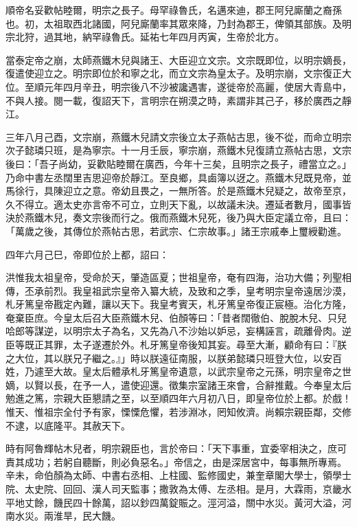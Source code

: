 
\begin{pinyinscope}

 順帝名妥歡帖睦爾，明宗之長子。母罕祿魯氏，名邁來迪，郡王阿兒廝蘭之裔孫也。初，太祖取西北諸國，阿兒廝蘭率其眾來降，乃封為郡王，俾領其部族。及明宗北狩，過其地，納罕祿魯氏。延祐七年四月丙寅，生帝於北方。



 當泰定帝之崩，太師燕鐵木兒與諸王、大臣迎立文宗。文宗既即位，以明宗嫡長，復遣使迎立之。明宗即位於和寧之北，而立文宗為皇太子。及明宗崩，文宗復正大位。至順元年四月辛丑，明宗後八不沙被讒遇害，遂徙帝於高麗，使居大青島中，不與人接。閱一載，復詔天下，言明宗在朔漠之時，素謂非其己子，移於廣西之靜江。



 三年八月己酉，文宗崩，燕鐵木兒請文宗後立太子燕帖古思，後不從，而命立明宗次子懿璘只班，是為寧宗。十一月壬辰，寧宗崩，燕鐵木兒復請立燕帖古思，文宗後曰：「吾子尚幼，妥歡貼睦爾在廣西，今年十三矣，且明宗之長子，禮當立之。」乃命中書左丞闊里吉思迎帝於靜江。至良鄉，具鹵簿以迓之。燕鐵木兒既見帝，並馬徐行，具陳迎立之意。帝幼且畏之，一無所答。於是燕鐵木兒疑之，故帝至京，久不得立。適太史亦言帝不可立，立則天下亂，以故議未決。遷延者數月，國事皆決於燕鐵木兒，奏文宗後而行之。俄而燕鐵木兒死，後乃與大臣定議立帝，且曰：「萬歲之後，其傳位於燕帖古思，若武宗、仁宗故事。」諸王宗戚奉上璽綬勸進。



 四年六月己巳，帝即位於上都，詔曰：



 洪惟我太祖皇帝，受命於天，肇造區夏；世祖皇帝，奄有四海，治功大備；列聖相傳，丕承前烈。我皇祖武宗皇帝入纂大統，及致和之季，皇考明宗皇帝遠居沙漠，札牙篤皇帝戡定內難，讓以天下。我皇考賓天，札牙篤皇帝復正宸極。治化方隆，奄棄臣庶。今皇太后召大臣燕鐵木兒、伯顏等曰：「昔者闊徹伯、脫脫木兒、只兒哈郎等謀逆，以明宗太子為名，又先為八不沙始以妒忌，妄構誣言，疏離骨肉。逆臣等既正其罪，太子遂遷於外。札牙篤皇帝後知其妄。尋至大漸，顧命有曰：『朕之大位，其以朕兄子繼之。』」時以朕遠征南服，以朕弟懿璘只班登大位，以安百姓，乃遽至大故。皇太后體承札牙篤皇帝遺意，以武宗皇帝之元孫，明宗皇帝之世嫡，以賢以長，在予一人，遣使迎還。徵集宗室諸王來會，合辭推戴。今奉皇太后勉進之篤，宗親大臣懇請之至，以至順四年六月初八日，即皇帝位於上都。於戲！惟天、惟祖宗全付予有家，慄慄危懼，若涉淵冰，罔知攸濟。尚賴宗親臣鄰，交修不逮，以底隆平。其赦天下。



 時有阿魯輝帖木兒者，明宗親臣也，言於帝曰：「天下事重，宜委宰相決之，庶可責其成功；若躬自聽斷，則必負惡名。」帝信之，由是深居宮中，每事無所專焉。辛未，命伯顏為太師、中書右丞相、上柱國、監修國史，兼奎章閣大學士，領學士院、太史院、回回、漢人司天監事；撒敦為太傅、左丞相。是月，大霖雨，京畿水平地丈餘，饑民四十餘萬，詔以鈔四萬錠賑之。涇河溢，關中水災。黃河大溢，河南水災。兩淮旱，民大饑。




\end{pinyinscope}
